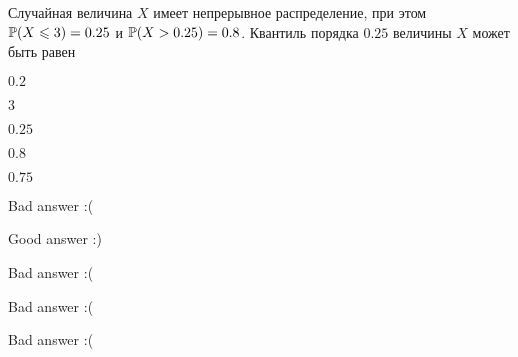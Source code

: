 
\begin{question}
Случайная величина \(X\) имеет непрерывное распределение, при этом
\(\P(X\leq 3)=0.25\) и \(\P(X>0.25)=0.8\). Квантиль порядка \(0.25\)
величины \(X\) может быть равен
\begin{answerlist}
  \item \(0.2\)
  \item \(3\)
  \item \(0.25\)
  \item \(0.8\)
  \item \(0.75\)
\end{answerlist}
\end{question}

\begin{solution}
\begin{answerlist}
  \item Bad answer :(
  \item Good answer :)
  \item Bad answer :(
  \item Bad answer :(
  \item Bad answer :(
\end{answerlist}
\end{solution}

